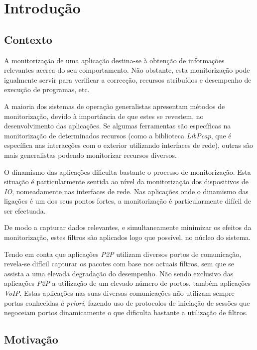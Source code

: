 \chapter{Introdução}\label{cap:introducao}

\section{Contexto}
\label{sec:intro_context}
A monitorização de uma aplicação destina-se à obtenção de informações relevantes acerca do seu comportamento.
Não obstante, esta monitorização pode igualmente servir para verificar a correcção, recursos atribuídos e desempenho de execução de programas, etc.

A maioria dos sistemas de operação generalistas apresentam métodos de monitorização, devido à importância de que estes se revestem, no desenvolvimento das aplicações.
Se algumas ferramentas são específicas na monitorização de determinados recursos (como a biblioteca \textit{LibPcap}, que é específica nas interacções com o exterior utilizando interfaces de rede), outras são mais generalistas podendo monitorizar recursos diversos.

O dinamismo das aplicações dificulta bastante o processo de monitorização.
Esta situação é particularmente sentida ao nível da monitorização dos dispositivos de \textit{IO}, nomeadamente nas interfaces de rede.
Nas aplicações onde o dinamismo das ligações é um dos seus pontos fortes, a monitorização é particularmente difícil de ser efectuada.

De modo a capturar dados relevantes, e simultaneamente minimizar os efeitos da monitorização, estes filtros são aplicados logo que possível, no núcleo do sistema.

Tendo em conta que aplicações \textit{P2P} utilizam diversos portos de comunicação, revela-se difícil capturar os pacotes com base nos actuais filtros, sem que se assista a uma elevada degradação do desempenho.
Não sendo exclusivo das aplicações \textit{P2P} a utilização de um elevado número de portos, também aplicações \textit{VoIP}.
Estas aplicações nas suas diversas comunicações não utilizam sempre portas conhecidas \textit{à priori}, fazendo uso de protocolos de iniciação de sessões que negoceiam portos dinamicamente o que dificulta bastante a utilização de filtros.



\section{Motivação}
\label{sub:intro_motivation}

